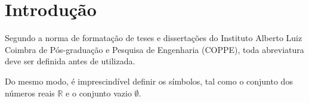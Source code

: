 \chapter{Introdução}

Segundo a norma de formata{\c c}\~ao de teses e disserta{\c c}\~oes do
Instituto Alberto Luiz Coimbra de P\'os-gradua{\c c}\~ao e Pesquisa de
Engenharia (COPPE), toda abreviatura deve ser definida antes de
utilizada.

Do mesmo modo, \'e imprescind\'ivel definir os s\'imbolos, tal como o
conjunto dos n\'umeros reais $\mathbb{R}$ e o conjunto vazio $\emptyset$.
